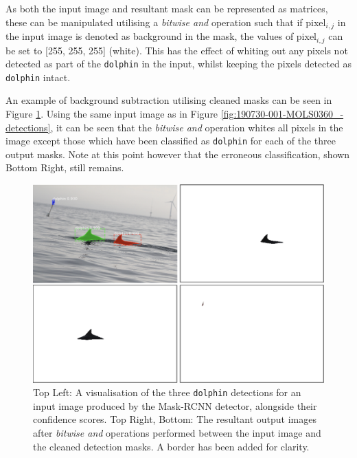 As both the input image and resultant mask can be represented as matrices, these can be manipulated utilising a \textit{bitwise and} operation such that if pixel$_{i, j}$ in the input image is denoted as background in the mask, the values of pixel$_{i, j}$ can be set to [255, 255, 255] (white). This has the effect of whiting out any pixels not detected as part of the \texttt{dolphin} in the input, whilst keeping the pixels detected as \texttt{dolphin} intact.

An example of background subtraction utilising cleaned masks can be seen in Figure \ref{fig:190730-001-MOLS0360_-bg-subtraction}. Using the same input image as in Figure \ref{fig:190730-001-MOLS0360_-detections}, it can be seen that the \textit{bitwise and} operation whites all pixels in the image except those which have been classified as \texttt{dolphin} for each of the three output masks. Note at this point however that the erroneous classification, shown Bottom Right, still remains. 

\begin{figure}[h]
	\begin{center}
		\includegraphics[scale=0.5]{Chapter4/figs/190730-001-MOLS0360_-bg-subtraction.png}
	\end{center}
	\caption{Top Left: A visualisation of the three \texttt{dolphin} detections for an input image produced by the Mask-RCNN detector, alongside their confidence scores. Top Right, Bottom: The resultant output images after \textit{bitwise and} operations performed between the input image and the cleaned detection masks. A border has been added for clarity.}
	\label{fig:190730-001-MOLS0360_-bg-subtraction}
\end{figure}

